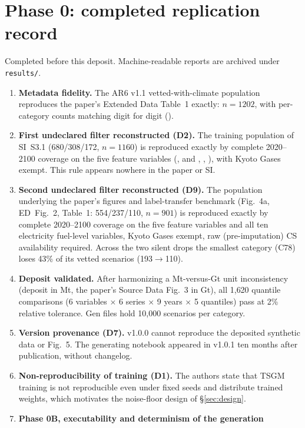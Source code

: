 \documentclass[11pt,a4paper]{article}
\begin{document}
\section{Phase 0: completed replication record}\label{sec:phase0}
Completed before this deposit. Machine-readable reports are archived under
\texttt{results/}.
\begin{enumerate}[nosep]
\item \textbf{Metadata fidelity.} The AR6 v1.1 vetted-with-climate
  population reproduces the paper's Extended Data Table~1 exactly: $n=1202$,
  with per-category counts matching digit for digit
  ().
\item \textbf{First undeclared filter reconstructed (D2).} The training
  population of SI~S3.1 (680/308/172, $n=1160$) is reproduced exactly by
  complete 2020--2100 coverage on the five feature variables
  (,  and ,
  , ), with Kyoto
  Gases exempt. This rule appears nowhere in the paper or SI.
\item \textbf{Second undeclared filter reconstructed (D9).} The population
  underlying the paper's figures and label-transfer benchmark (Fig.~4a,
  ED~Fig.~2, Table~1: 554/237/110, $n=901$) is reproduced exactly by
  complete 2020--2100 coverage on the five feature variables and all ten
  electricity fuel-level variables, Kyoto Gases exempt, raw
  (pre-imputation) CS availability required. Across the two silent drops
  the smallest category (C78) loses 43\% of its vetted scenarios
  (193$\to$110).
\item \textbf{Deposit validated.} After harmonizing a Mt-versus-Gt unit
  inconsistency (deposit in Mt, the paper's Source Data Fig.~3 in Gt), all
  1{,}620 quantile comparisons (6 variables $\times$ 6 series $\times$ 9
  years $\times$ 5 quantiles) pass at 2\% relative tolerance. Gen files
  hold 10{,}000 scenarios per category.
\item \textbf{Version provenance (D7).} v1.0.0 cannot reproduce the
  deposited synthetic data or Fig.~5. The generating notebook appeared in
  v1.0.1 ten months after publication, without changelog.
\item \textbf{Non-reproducibility of training (D1).} The authors state that
  TSGM training is not reproducible even under fixed seeds and distribute
  trained weights, which motivates the noise-floor design of
  \S\ref{sec:design}.
\item \textbf{Phase 0B, executability and determinism of the generation
}
\end{enumerate}
\end{document}

